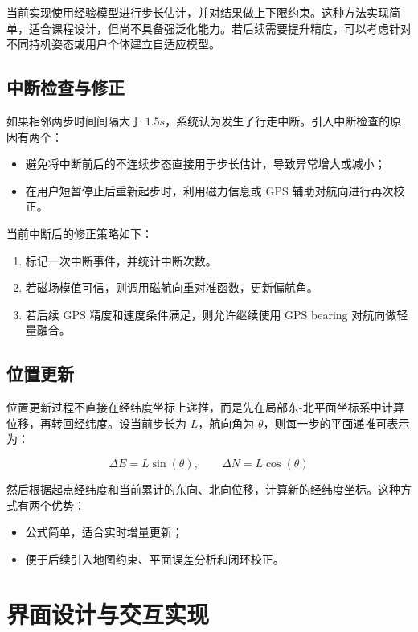 \documentclass[12pt,a4paper]{ctexart}
\begin{document}
当前实现使用经验模型进行步长估计，并对结果做上下限约束。这种方法实现简单，适合课程设计，但尚不具备强泛化能力。若后续需要提升精度，可以考虑针对不同持机姿态或用户个体建立自适应模型。

\subsection{中断检查与修正}
如果相邻两步时间间隔大于 $1.5s$，系统认为发生了行走中断。引入中断检查的原因有两个：

\begin{itemize}
    \item 避免将中断前后的不连续步态直接用于步长估计，导致异常增大或减小；
    \item 在用户短暂停止后重新起步时，利用磁力信息或 GPS 辅助对航向进行再次校正。
\end{itemize}

当前中断后的修正策略如下：

\begin{enumerate}
    \item 标记一次中断事件，并统计中断次数。
    \item 若磁场模值可信，则调用磁航向重对准函数，更新偏航角。
    \item 若后续 GPS 精度和速度条件满足，则允许继续使用 GPS bearing 对航向做轻量融合。
\end{enumerate}

\subsection{位置更新}
位置更新过程不直接在经纬度坐标上递推，而是先在局部东-北平面坐标系中计算位移，再转回经纬度。设当前步长为 $L$，航向角为 $\theta$，则每一步的平面递推可表示为：

\begin{equation}
\Delta E = L \sin(\theta), \qquad \Delta N = L \cos(\theta)
\end{equation}

然后根据起点经纬度和当前累计的东向、北向位移，计算新的经纬度坐标。这种方式有两个优势：

\begin{itemize}
    \item 公式简单，适合实时增量更新；
    \item 便于后续引入地图约束、平面误差分析和闭环校正。
\end{itemize}

\section{界面设计与交互实现}
\end{document}
